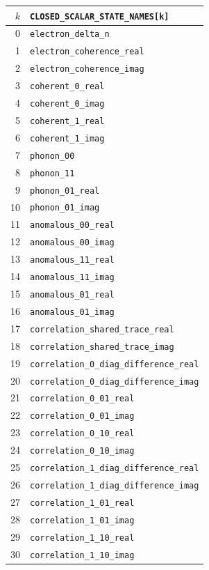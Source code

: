 \documentclass[10pt,letterpaper,twocolumn]{article}
\renewcommand{\arraystretch}{1.12}
\newcommand{\code}[1]{\texttt{#1}}
\begin{document}
\begin{center}
\fontsize{6.7}{7.4}\selectfont
\renewcommand{\arraystretch}{0.93}
\begin{tabular}{@{}r l@{}}
\toprule
\(k\) & \code{CLOSED\_SCALAR\_STATE\_NAMES[k]}\\
\midrule
0 & \code{electron\_delta\_n}\\
1 & \code{electron\_coherence\_real}\\
2 & \code{electron\_coherence\_imag}\\
3 & \code{coherent\_0\_real}\\
4 & \code{coherent\_0\_imag}\\
5 & \code{coherent\_1\_real}\\
6 & \code{coherent\_1\_imag}\\
7 & \code{phonon\_00}\\
8 & \code{phonon\_11}\\
9 & \code{phonon\_01\_real}\\
10 & \code{phonon\_01\_imag}\\
11 & \code{anomalous\_00\_real}\\
12 & \code{anomalous\_00\_imag}\\
13 & \code{anomalous\_11\_real}\\
14 & \code{anomalous\_11\_imag}\\
15 & \code{anomalous\_01\_real}\\
16 & \code{anomalous\_01\_imag}\\
17 & \code{correlation\_shared\_trace\_real}\\
18 & \code{correlation\_shared\_trace\_imag}\\
19 & \code{correlation\_0\_diag\_difference\_real}\\
20 & \code{correlation\_0\_diag\_difference\_imag}\\
21 & \code{correlation\_0\_01\_real}\\
22 & \code{correlation\_0\_01\_imag}\\
23 & \code{correlation\_0\_10\_real}\\
24 & \code{correlation\_0\_10\_imag}\\
25 & \code{correlation\_1\_diag\_difference\_real}\\
26 & \code{correlation\_1\_diag\_difference\_imag}\\
27 & \code{correlation\_1\_01\_real}\\
28 & \code{correlation\_1\_01\_imag}\\
29 & \code{correlation\_1\_10\_real}\\
30 & \code{correlation\_1\_10\_imag}\\
\bottomrule
\end{tabular}
\end{center}
\end{document}
